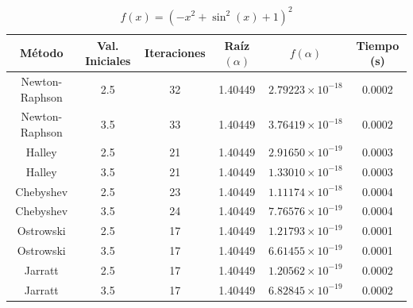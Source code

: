 \begin{table}[H]
\centering

\renewcommand{\arraystretch}{1.3} %
\setlength{\tabcolsep}{12pt}      %

\begin{tabular}{cccccc}
\hline
Método & Val. Iniciales & Iteraciones & Raíz $(\alpha)$ & $f(\alpha)$ & Tiempo (s) \\
\hline

Newton-Raphson & 2.5 & 32 & 1.40449 & $2.79223\times10^{-18}$ & 0.0002 \\

Newton-Raphson & 3.5 & 33 & 1.40449 & $3.76419\times10^{-18}$ & 0.0002 \\

Halley         & 2.5 & 21 & 1.40449 & $2.91650\times10^{-19}$ & 0.0003 \\

Halley         & 3.5 & 21 & 1.40449 & $1.33010\times10^{-18}$ & 0.0003 \\

Chebyshev      & 2.5 & 23 & 1.40449 & $1.11174\times10^{-18}$ & 0.0004 \\

Chebyshev      & 3.5 & 24 & 1.40449 & $7.76576\times10^{-19}$ & 0.0004 \\

Ostrowski      & 2.5 & 17 & 1.40449 & $1.21793\times10^{-19}$ & 0.0001 \\

Ostrowski      & 3.5 & 17 & 1.40449 & $6.61455\times10^{-19}$ & 0.0001 \\

Jarratt        & 2.5 & 17 & 1.40449 & $1.20562\times10^{-19}$ & 0.0002 \\

Jarratt        & 3.5 & 17 & 1.40449 & $6.82845\times10^{-19}$ & 0.0002 \\

\hline
\end{tabular}

\caption{$f(x) = \left(- x^{2} + \sin^{2}{\left(x \right)} + 1\right)^{2}$}
\end{table}


